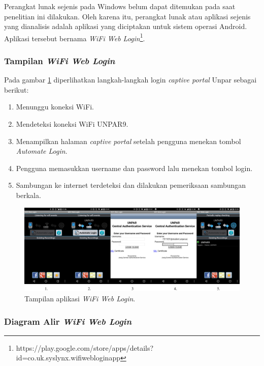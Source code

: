Perangkat lunak sejenis pada Windows belum dapat ditemukan pada saat penelitian ini dilakukan. Oleh karena itu, perangkat lunak atau aplikasi sejenis yang dianalisis adalah aplikasi yang diciptakan untuk sistem operasi Android. Aplikasi tersebut bernama \textit{WiFi Web Login}\footnote{https://play.google.com/store/apps/details?id=co.uk.syslynx.wifiwebloginapp}.

\subsubsection{Tampilan \textit{WiFi Web Login}}
\label{subsubsec:tampilan_wifi_web_login}

Pada gambar \ref{fig:screenshot_wifiweblogin} diperlihatkan langkah-langkah login \textit{captive portal} Unpar sebagai berikut:

\begin{enumerate}
    \item{Menunggu koneksi WiFi.}
    \item{Mendeteksi koneksi WiFi UNPAR9.}
    \item{Menampilkan halaman \textit{captive portal} setelah pengguna menekan tombol \textit{Automate Login}.}
    \item{Pengguna memasukkan username dan password lalu menekan tombol login.}
    \item{Sambungan ke internet terdeteksi dan dilakukan pemeriksaan sambungan berkala.}
\end{enumerate}

\begin{figure}[h]
    \centering
    \includegraphics[scale=0.085]{Gambar/screenshot_wifiweblogin.png}
    \caption[Tampilan aplikasi \textit{WiFi Web Login}.]{Tampilan aplikasi \textit{WiFi Web Login}.} 
    \label{fig:screenshot_wifiweblogin}
\end{figure}

\subsubsection{Diagram Alir \textit{WiFi Web Login}}
\label{subsubsec:diagram_alir_wifi_web_login}

